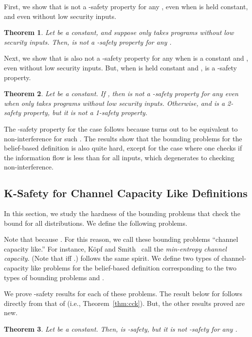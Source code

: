\documentclass{llncs}
\newtheorem{theorem}{Theorem}[section]
\begin{document}
First, we show that  is not a -safety
property for any , even when  is held constant, and even without
low security inputs.
\begin{theorem}
\label{thm:be1nk}
Let  be a constant, and suppose  only
takes programs without low security inputs.  Then,  is not a -safety property for any .
\end{theorem}
Next, we show that  is also not a -safety property
for any  when  is a constant and , even without low
security inputs.  But, when  is held constant and ,  is a -safety property.
\begin{theorem}
\label{thm:be2nk1}
  Let  be a constant.  If , then  is not a
  -safety property for any  even when  only
  takes programs without low security inputs.  Otherwise,  and
   is a 2-safety property, but it is not a 1-safety
  property.
\end{theorem}
The -safety property for the case  follows because  turns out to be equivalent to non-interference for such
.  The results show that the bounding problems for the belief-based
definition is also quite hard, except for the case where one checks if
the information flow is less than  for all inputs, which degenerates
to checking non-interference.


\subsection{K-Safety for Channel Capacity Like Definitions}

\label{sec:ksafetycclike}

In this section, we study the hardness of the bounding problems that
check the bound for all distributions.  We define the following problems.

Note that  because .  For this reason, we call these bounding
problems ``channel capacity like.'' For instance, K{\"o}pf and
Smith~\cite{DBLP:conf/csfw/KopfS10} call 
the {\em min-entropy channel capacity}.  (Note that  iff .)  
follows the same spirit.  We define two types of channel-capacity like
problems for the belief-based definition corresponding to the two
types of bounding problems  and .

We prove -safety results for each of these problems.  The result
below for  follows directly from that of 
(i.e., Theorem~\ref{thm:cck}).  But, the other results proved are
  new.
\begin{theorem}
\label{thm:secck}
Let  be a constant.  Then,  is
-safety, but it is not -safety for any .
\end{theorem}
\end{document}

